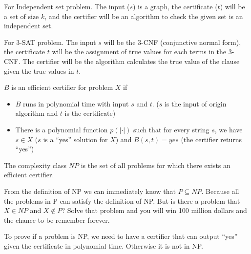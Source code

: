 
					\begin{example}
						For Independent set problem. The input ($s$) is a graph, the certificate ($t$) will be a set of size $k$, and the certifier will be an algorithm to check the given set is an independent set.
					\end{example}

					\begin{example}
						For 3-SAT problem. The input $s$ will be the 3-CNF (conjunctive normal form), the certificate $t$ will be the assignment of true values for each terms in the 3-CNF. The certifier will be the algorithm calculates the true value of the clause given the true values in $t$.
					\end{example}

					\begin{definition}
						$B$ is an efficient certifier for problem $X$ if
						\begin{itemize}
							\item $B$ runs in polynomial time with input $s$ and $t$. ($s$ is the input of origin algorithm and $t$ is the certificate)
							\item There is a polynomial function $p(|\cdot|)$ such that for every string $s$, we have $s \in X$ ($s$ is a ``yes'' solution for $X$) and $B(s, t) = yes$ (the certifier returns ``yes'')
						\end{itemize}
					\end{definition}

					\begin{definition}[NP]
						The complexity class $NP$ is the set of all problems for which there exists an efficient certifier.
					\end{definition}

					From the definition of NP we can immediately know that $P \subseteq NP$. Because all the problems in P can satisfy the definition of NP. But is there a problem that $X \in NP$ and $X \notin P$? Solve that problem and you will win 100 million dollars and the chance to be remember forever.


					To prove if a problem is NP, we need to have a certifier that can output ``yes'' given the certificate in polynomial time. Otherwise it is not in NP.

